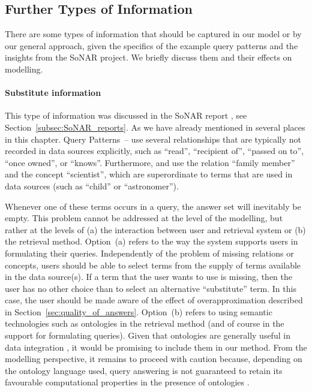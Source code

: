 \subsection{Further Types of Information}
\label{subsec:further_information}

There are some types of information that should be captured in our model
or by our general approach,
given the specifics of the example query patterns
and the insights from the SoNAR project.
We briefly discuss them and their effects on modelling.

\paragraph{Substitute information}

This type of information was discussed
in the SoNAR report \autocite{Fangerau2022}, see Section~\ref{subsec:SoNAR_reports}.
As we have already mentioned in several places in this chapter.
Query Patterns~-- use several relationships
that are typically not recorded in data sources explicitly, such as
\enquote{read}, \enquote{recipient of}, \enquote{passed on to},
\enquote{once owned}, or \enquote{knows}.
Furthermore,  and 
use the relation \enquote{family member} and the concept \enquote{scientist},
which are superordinate to terms that are used in data sources
(such as \enquote{child} or \enquote{astronomer}).

Whenever one of these terms occurs in a query,
the answer set will inevitably be empty.
This problem cannot be addressed at the level of the modelling,
but rather at the levels of (a) the interaction between user and retrieval system
or (b) the retrieval method.
Option~(a) refers to the way the system supports users in formulating their queries.
Independently of the problem of missing relations or concepts, users should be able to 
select terms from the supply of terms available in the data source(s).
If a term that the user wants to use is missing, then the user has no other choice than
to select an alternative \enquote{substitute} term.
In this case, the user should be made aware of the effect of overapproximation
described in Section~\ref{sec:quality_of_answers}.
Option~(b) refers to using semantic technologies such as ontologies
in the retrieval method (and of course in the support for formulating queries).
Given that ontologies are generally useful in data integration \autocite[§12]{Doan2012},
it would be promising to include them in our method.
From the modelling perspective, it remains to proceed with caution
because, depending on the ontology language used,
query answering is not guaranteed to retain its favourable computational properties
in the presence of ontologies \autocite{Lutz2016,Xiao2018,Barcelo2019}.

